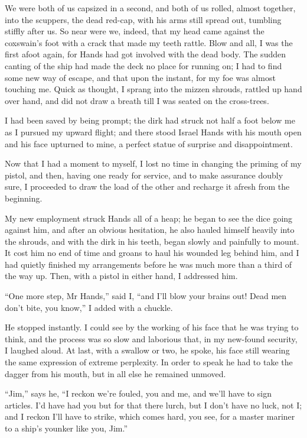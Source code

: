 We were both of us capsized in a second, and both of us rolled, almost together, into the scuppers, the dead red-cap, with his arms still spread out, tumbling stiffly after us. So near were we, indeed, that my head came against the coxswain’s foot with a crack that made my teeth rattle. Blow and all, I was the first afoot again, for Hands had got involved with the dead body. The sudden canting of the ship had made the deck no place for running on; I had to find some new way of escape, and that upon the instant, for my foe was almost touching me. Quick as thought, I sprang into the mizzen shrouds, rattled up hand over hand, and did not draw a breath till I was seated on the cross-trees.

I had been saved by being prompt; the dirk had struck not half a foot below me as I pursued my upward flight; and there stood Israel Hands with his mouth open and his face upturned to mine, a perfect statue of surprise and disappointment.

Now that I had a moment to myself, I lost no time in changing the priming of my pistol, and then, having one ready for service, and to make assurance doubly sure, I proceeded to draw the load of the other and recharge it afresh from the beginning.

My new employment struck Hands all of a heap; he began to see the dice going against him, and after an obvious hesitation, he also hauled himself heavily into the shrouds, and with the dirk in his teeth, began slowly and painfully to mount. It cost him no end of time and groans to haul his wounded leg behind him, and I had quietly finished my arrangements before he was much more than a third of the way up. Then, with a pistol in either hand, I addressed him.

\enquote{One more step, Mr Hands,} said I, \enquote{and I’ll blow your brains out! Dead men don’t bite, you know,} I added with a chuckle.

He stopped instantly. I could see by the working of his face that he was trying to think, and the process was so slow and laborious that, in my new-found security, I laughed aloud. At last, with a swallow or two, he spoke, his face still wearing the same expression of extreme perplexity. In order to speak he had to take the dagger from his mouth, but in all else he remained unmoved.

\enquote{Jim,} says he, \enquote{I reckon we’re fouled, you and me, and we’ll have to sign articles. I’d have had you but for that there lurch, but I don’t have no luck, not I; and I reckon I’ll have to strike, which comes hard, you see, for a master mariner to a ship’s younker like you, Jim.}

